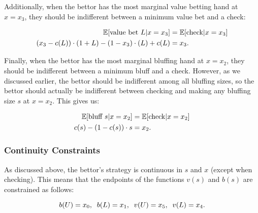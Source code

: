 \documentclass[../../main/main.tex]{subfiles}
\begin{document}
Additionally, when the bettor has the most marginal value betting hand at $x=x_3$, they should be indifferent between a minimum value bet and a check: 

\begin{align}{\label{valueindiff}}
    \nonumber \mathbb{E}[\text{value bet } L | x=x_3] & = \mathbb{E}[\text{check} | x=x_3]\\ 
    (x_3-c(L)) \cdot (1+L) - (1-x_3) \cdot (L) + c(L) & = x_3.
\end{align}

Finally, when the bettor has the most marginal bluffing hand at $x=x_2$, they should be indifferent between a minimum bluff and a check. However, as we discussed earlier, the bettor should be indifferent among all bluffing sizes, so the bettor should actually be indifferent between checking and making any bluffing size $s$ at $x=x_2$. This gives us:

\begin{align}{\label{bluffindiff}}
    \nonumber \mathbb{E}[\text{bluff } s | x=x_2] & = \mathbb{E}[\text{check} | x=x_2]\\ 
    c(s) - (1-c(s)) \cdot s & = x_2.
\end{align}

\subsubsection{Continuity Constraints}

As discussed above, the bettor's strategy is continuous in $s$ and $x$ (except when checking). This means that the endpoints of the functions $v(s)$ and $b(s)$ are constrained as follows:

\begin{equation}{\label{continuityconstraints}}
	 b(U) = x_0, \;\; b(L) = x_1, \;\; v(U) = x_5, \;\; v(L) = x_4.
\end{equation}
\end{document}
